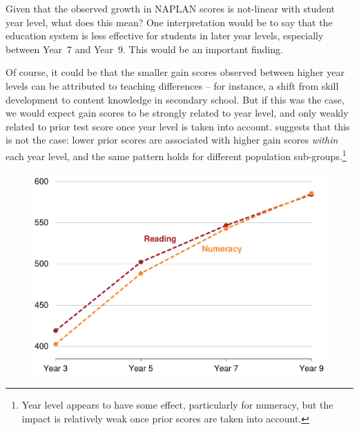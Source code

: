 Given that the observed growth in NAPLAN scores is not-linear with student year level, what does this mean? One interpretation would be to say that the education system is less effective for students in later year levels, especially between \mbox{Year 7} and \mbox{Year 9}. This would be an important finding.

Of course, it could be that the smaller gain scores observed between higher year levels can be attributed to teaching differences -- for instance, a shift from skill development to content knowledge in secondary school. But if this was the case, we would expect gain scores to be strongly related to year level, and only weakly related to prior test score once year level is taken into account.  suggests that this is not the case: lower prior scores are associated with higher gain scores \textit{within} each year level, and the same pattern holds for different population sub-groups.\footnote{Year level appears to have some effect, particularly for numeracy, but the impact is relatively weak once prior scores are taken into account.}
\begin{figure}[t]
 \includegraphics[width=\columnwidth]{atlas/PoP.pdf}\label{fig:path}

\end{figure}

